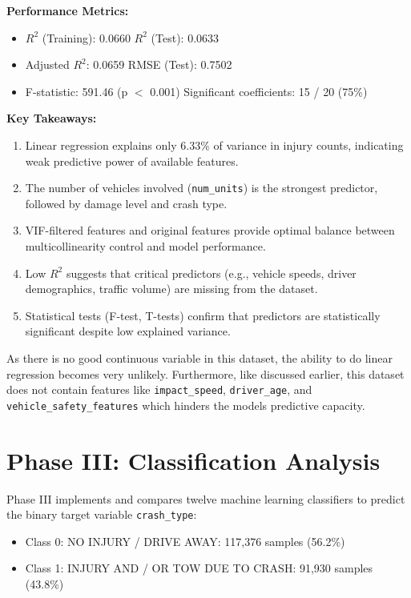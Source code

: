 \documentclass[stu,12pt,floatsintext]{apa7}
\begin{document}
\textbf{Performance Metrics:}

\begin{itemize}[noitemsep,topsep=0pt]
    \item $R^2$ (Training): 0.0660 \hfill $R^2$ (Test): 0.0633
    \item Adjusted $R^2$: 0.0659 \hfill RMSE (Test): 0.7502
    \item F-statistic: 591.46 (p $<$ 0.001) \hfill Significant coefficients: 15 / 20 (75\%)
\end{itemize}

\textbf{Key Takeaways:}
\begin{enumerate}
    \item Linear regression explains only 6.33\% of variance in injury counts, indicating weak predictive power of available features.
    \item The number of vehicles involved (\texttt{num\_units}) is the strongest predictor, followed by damage level and crash type.
    \item VIF-filtered features and original features provide optimal balance between multicollinearity control and model performance.
    \item Low $R^2$ suggests that critical predictors (e.g., vehicle speeds, driver demographics, traffic volume) are missing from the dataset.
    \item Statistical tests (F-test, T-tests) confirm that predictors are statistically significant despite low explained variance.
\end{enumerate}

As there is no good continuous variable in this dataset, the ability to do linear regression becomes very unlikely. Furthermore, like discussed earlier, 
this dataset does not contain features like \texttt{impact\_speed}, \texttt{driver\_age}, and \texttt{vehicle\_safety\_features} which hinders 
the models predictive capacity. 

\section{Phase III: Classification Analysis}

Phase III implements and compares twelve machine learning classifiers to predict the binary target variable \texttt{crash\_type}:
\begin{itemize}
    \item Class 0: NO INJURY / DRIVE AWAY: 117,376 samples (56.2\%)
    \item Class 1: INJURY AND / OR TOW DUE TO CRASH: 91,930 samples (43.8\%)
\end{itemize}
\end{document}
